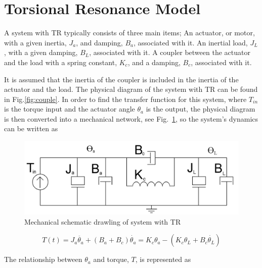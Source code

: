 \section{Torsional Resonance Model}\label{sec:trModel}
A system with TR typically consists of three main items;
An actuator, or motor, with a given inertia, $J_a$, and damping, $B_a$, associated with it.
An inertial load, $J_L$, with a given damping, $B_L$, associated with it.
A coupler between the actuator and the load with a spring constant, $K_c$, and a damping, $B_c$, associated with it.


It is assumed that the inertia of the coupler is included in the inertia of the actuator and the load. The physical diagram of the system with TR can be found in Fig.\ref{fig:couple}. In order to find the transfer function for this system, where $T_{in}$ is the torque input and the actuator angle $\theta_a$ is the output, the physical diagram is then converted into a mechanical network, see Fig.~\ref{fig:mech}, so the system's dynamics can be written as

\begin{figure}[h]
  \centering
\includegraphics[width=1.0\columnwidth]{./pix/mech.png}
  \caption{Mechanical schematic drawling of system with TR}
  \label{fig:mech}
\end{figure}

\begin{equation}
T(t) = J_a\ddot{\theta_a}+(B_a+B_c ) \dot{\theta_a}=K_c\theta_a-(K_c\theta_L+B_c\dot{\theta_L})
\end{equation}

The relationship between $\theta_a$ and torque, $T$, is represented as




